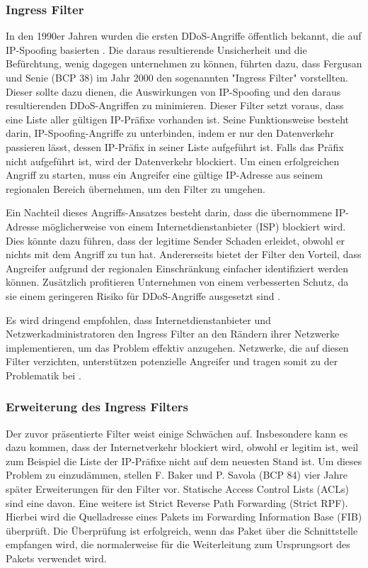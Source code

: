 \documentclass[sigplan,screen]{acmart}
\begin{document}
\subsubsection{Ingress Filter}

In den 1990er Jahren wurden die ersten DDoS-Angriffe öffentlich bekannt, die auf IP-Spoofing basierten \cite{CRP01}. Die daraus resultierende Unsicherheit und die Befürchtung, wenig dagegen unternehmen zu können, führten dazu, dass Fergusan und Senie (BCP 38) \cite{Ingress01} im Jahr 2000 den sogenannten "Ingress Filter" vorstellten. Dieser sollte dazu dienen, die Auswirkungen von IP-Spoofing und den daraus resultierenden DDoS-Angriffen zu minimieren. Dieser Filter setzt voraus, dass eine Liste aller gültigen IP-Präfixe vorhanden ist. Seine Funktionsweise besteht darin, IP-Spoofing-Angriffe zu unterbinden, indem er nur den Datenverkehr passieren lässt, dessen IP-Präfix in seiner Liste aufgeführt ist. Falls das Präfix nicht aufgeführt ist, wird der Datenverkehr blockiert. Um einen erfolgreichen Angriff zu starten, muss ein Angreifer eine gültige IP-Adresse aus seinem regionalen Bereich übernehmen, um den Filter zu umgehen.

Ein Nachteil dieses Angriffs-Ansatzes besteht darin, dass die übernommene IP-Adresse möglicherweise von einem Internetdienstanbieter (ISP) blockiert wird. Dies könnte dazu führen, dass der legitime Sender Schaden erleidet, obwohl er nichts mit dem Angriff zu tun hat. Andererseits bietet der Filter den Vorteil, dass Angreifer aufgrund der regionalen Einschränkung einfacher identifiziert werden können. Zusätzlich profitieren Unternehmen von einem verbesserten Schutz, da sie einem geringeren Risiko für DDoS-Angriffe ausgesetzt sind \cite{Ingress01}.

Es wird dringend empfohlen, dass Internetdienstanbieter und Netzwerkadministratoren den Ingress Filter an den Rändern ihrer Netzwerke implementieren, um das Problem effektiv anzugehen. Netzwerke, die auf diesen Filter verzichten, unterstützen potenzielle Angreifer und tragen somit zu der Problematik bei \cite{manrs01}.

\subsubsection{Erweiterung des Ingress Filters}

Der zuvor präsentierte Filter weist einige Schwächen auf. Insbesondere kann es dazu kommen, dass der Internetverkehr blockiert wird, obwohl er legitim ist, weil zum Beispiel die Liste der IP-Präfixe nicht auf dem neuesten Stand ist. Um dieses Problem zu einzudämmen, stellen F. Baker und P. Savola (BCP 84) \cite{Bcp84} vier Jahre später Erweiterungen für den Filter vor. Statische Access Control Lists (ACLs) sind eine davon. Eine weitere ist Strict Reverse Path Forwarding (Strict RPF). Hierbei wird die Quelladresse eines Pakets im Forwarding Information Base (FIB) überprüft. Die Überprüfung ist erfolgreich, wenn das Paket über die Schnittstelle empfangen wird, die normalerweise für die Weiterleitung zum Ursprungsort des Pakets verwendet wird.
\end{document}
